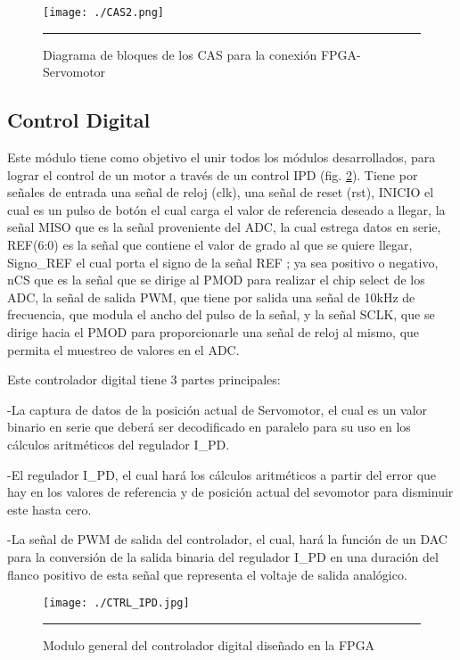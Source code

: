 \documentclass[12pt,a4paper]{article} %
\begin{document}
\begin{figure}[htbp]
  \centering
    \texttt{[image: ./CAS2.png]}
    \rule{35em}{0.3pt}
  \caption[CAS2im]{Diagrama de bloques de los CAS para la conexión FPGA-Servomotor}
  \label{fig:CAS2im}
\end{figure}

\subsection{Control Digital}

Este módulo tiene como objetivo el unir todos los módulos desarrollados, para lograr el control de un motor a través de un control IPD (fig. \ref{fig:ModGen}). Tiene por señales de entrada una señal de reloj (clk), una señal de reset (rst), INICIO el cual es un pulso de botón el cual carga el valor de referencia deseado a llegar, la señal MISO que es la señal proveniente del ADC, la cual estrega datos en serie, REF(6:0) es la señal que contiene el valor de grado al que se quiere llegar, Signo\_REF el cual porta el signo de la señal REF ; ya sea positivo o negativo, nCS que es la señal que se dirige al PMOD para realizar el chip select de los ADC, la señal de salida PWM, que tiene por salida una señal de 10kHz de frecuencia, que modula el ancho del pulso de la señal, y la señal SCLK, que se dirige hacia el PMOD para proporcionarle una señal de reloj al mismo, que permita el muestreo de valores en el ADC.

Este controlador digital tiene 3 partes principales:

-La captura de datos de la posición actual de Servomotor, el cual es un valor binario en serie que deberá ser decodificado en paralelo para su uso  en los cálculos aritméticos del regulador I\_PD.

-El regulador I\_PD, el cual hará los cálculos aritméticos a partir del error que hay en los valores de referencia y de posición actual del sevomotor para disminuir este hasta cero.

-La señal de PWM de salida del controlador, el cual, hará la función de un DAC para la conversión de la salida binaria del regulador I\_PD en una duración del flanco positivo de esta señal que representa el voltaje de salida analógico.

\begin{figure}[htbp]
  \centering
    \texttt{[image: ./CTRL\_IPD.jpg]}
    \rule{35em}{0.3pt}
  \caption[CAS2im]{Modulo general del controlador digital diseñado en la FPGA}
  \label{fig:ModGen}
\end{figure}
\end{document}
